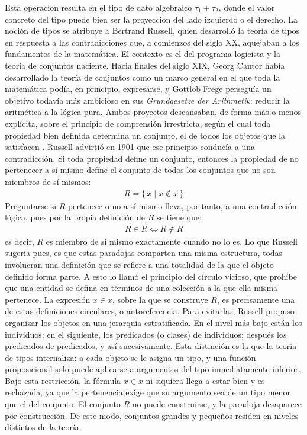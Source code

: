Esta operacion resulta en el tipo de dato algebraico $\tau_1 + \tau_2$, donde el valor concreto del tipo puede bien ser la proyección del lado izquierdo o el derecho.
\newline
\newline
\indent La noción de tipos se atribuye a Bertrand Russell, quien desarrolló la teoría de tipos en respuesta a las contradicciones que, a comienzos del siglo XX, aquejaban a los fundamentos de la matemática. El contexto es el del programa logicista y la teoría de conjuntos naciente. Hacia finales del siglo XIX, Georg Cantor había desarrollado la teoría de conjuntos como un marco general en el que toda la matemática podía, en principio, expresarse, y Gottlob Frege perseguía un objetivo todavía más ambicioso en sus \textit{Grundgesetze der Arithmetik}: reducir la aritmética a la lógica pura. Ambos proyectos descansaban, de forma más o menos explícita, sobre el principio de comprensión irrestricta, según el cual toda propiedad bien definida determina un conjunto, el de todos los objetos que la satisfacen \citep{sep-type-theory}.
\newline
\newline
\indent Russell advirtió en 1901 que ese principio conducía a una contradicción. Si toda propiedad define un conjunto, entonces la propiedad de no pertenecer a sí mismo define el conjunto de todos los conjuntos que no son miembros de sí mismos:
\begin{align}
  R = \{\, x \mid x \notin x \,\}
\end{align}
Preguntarse si $R$ pertenece o no a sí mismo lleva, por tanto, a una contradicción lógica, pues por la propia definición de $R$ se tiene que:
\begin{align}
  R \in R \iff R \notin R
\end{align}
es decir, $R$ es miembro de sí mismo exactamente cuando no lo es.
\newline
\newline
\indent Lo que Russell sugeria pues, es que estas paradojas comparten una misma estructura, todas involucran una definición que se refiere a una totalidad de la que el objeto definido forma parte. A esto lo llamó el principio del círculo vicioso, que prohíbe que una entidad se defina en términos de una colección a la que ella misma pertenece. La expresión $x \in x$, sobre la que se construye $R$, es precisamente una de estas definiciones circulares, o autoreferencia.
\newline
\newline
\indent Para evitarlas, Russell propuso organizar los objetos en una jerarquía estratificada. En el nivel más bajo están los individuos; en el siguiente, los predicados (o clases) de individuos; después los predicados de predicados, y así sucesivamente. Esta distinción es la que la teoría de tipos internaliza: a cada objeto se le asigna un tipo, y una función proposicional solo puede aplicarse a argumentos del tipo inmediatamente inferior. Bajo esta restricción, la fórmula $x \in x$ ni siquiera llega a estar bien  y es rechazada, ya que la pertenencia exige que su argumento sea de un tipo menor que el del conjunto. El conjunto $R$ no puede construirse, y la paradoja desaparece por construcción. De este modo, conjuntos grandes y pequeños residen en niveles distintos de la teoría.
